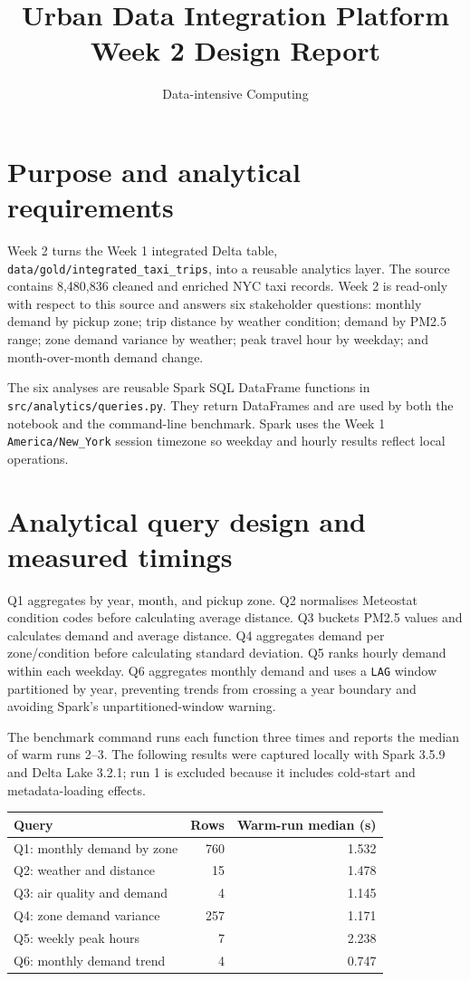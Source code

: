 \documentclass[11pt,a4paper]{article}
\title{Urban Data Integration Platform\\\large Week 2 Design Report}
\author{Data-intensive Computing}
\date{}
\begin{document}
\maketitle

\section{Purpose and analytical requirements}
Week 2 turns the Week 1 integrated Delta table, \texttt{data/gold/integrated\_taxi\_trips}, into a reusable analytics layer. The source contains 8,480,836 cleaned and enriched NYC taxi records. Week 2 is read-only with respect to this source and answers six stakeholder questions: monthly demand by pickup zone; trip distance by weather condition; demand by PM2.5 range; zone demand variance by weather; peak travel hour by weekday; and month-over-month demand change.

The six analyses are reusable Spark SQL DataFrame functions in \texttt{src/analytics/queries.py}. They return DataFrames and are used by both the notebook and the command-line benchmark. Spark uses the Week 1 \texttt{America/New\_York} session timezone so weekday and hourly results reflect local operations.

\section{Analytical query design and measured timings}
Q1 aggregates by year, month, and pickup zone. Q2 normalises Meteostat condition codes before calculating average distance. Q3 buckets PM2.5 values and calculates demand and average distance. Q4 aggregates demand per zone/condition before calculating standard deviation. Q5 ranks hourly demand within each weekday. Q6 aggregates monthly demand and uses a \texttt{LAG} window partitioned by year, preventing trends from crossing a year boundary and avoiding Spark's unpartitioned-window warning.

The benchmark command runs each function three times and reports the median of warm runs 2--3. The following results were captured locally with Spark 3.5.9 and Delta Lake 3.2.1; run 1 is excluded because it includes cold-start and metadata-loading effects.

\begin{center}
\small
\begin{tabular}{lrr}
\toprule
Query & Rows & Warm-run median (s) \\
\midrule
Q1: monthly demand by zone & 760 & 1.532 \\
Q2: weather and distance & 15 & 1.478 \\
Q3: air quality and demand & 4 & 1.145 \\
Q4: zone demand variance & 257 & 1.171 \\
Q5: weekly peak hours & 7 & 2.238 \\
Q6: monthly demand trend & 4 & 0.747 \\
\bottomrule
\end{tabular}
\end{center}
\end{document}

